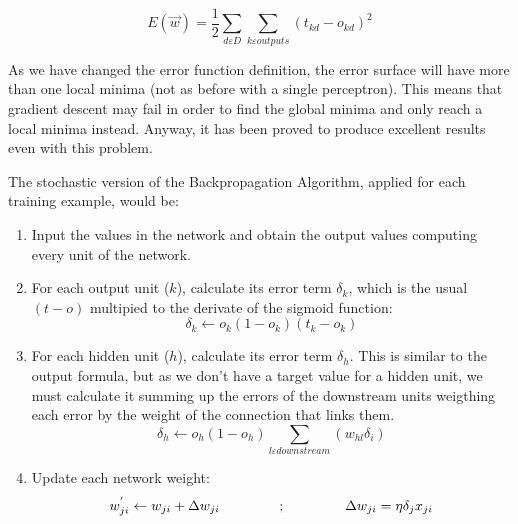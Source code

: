 		\begin{equation}
			\label{squared_error_function_network}
			E(\vec{w}) = \frac{1}{2} \sum_{d \varepsilon D} \sum_{k \varepsilon outputs} (t_{kd}-o_{kd})^2 
		\end{equation}

	As we have changed the error function definition, the error surface will have more than one local minima (not as before with a single perceptron). This means that gradient descent may fail in order to find the global minima and only reach a local minima instead. Anyway, it has been proved to produce excellent results even with this problem.

	The stochastic version of the Backpropagation Algorithm, applied for each training example, would be:

		\begin{enumerate}

			\item Input the values in the network and obtain the output values computing every unit of the network.
			\item For each output unit ($k$), calculate its error term $\delta_k$, which is the usual $(t-o)$ multipied to the derivate of the sigmoid function:
				\begin{equation}
					\label{backpropagation_output_error}
					\delta_k \leftarrow o_k (1 - o_k)(t_k - o_k)
				\end{equation}				

			\item For each hidden unit ($h$), calculate its error term $\delta_h$. This is similar to the output formula, but as we don't have a target value for a hidden unit, we must calculate it summing up the errors of the downstream units weigthing each error by the weight of the connection that links them. 
				\begin{equation}
					\label{backpropagation_hidden_error}
					\delta_h \leftarrow o_h (1 - o_h) \sum_{l \varepsilon downstream} (w_{hl} \delta_i)
				\end{equation}

			\item Update each network weight:
				\begin{equation}
					\label{backpropagation_weight_update}
					w^{'}_{ji} \leftarrow w_{ji} + \Delta w_{ji} \hspace{1.5cm} ; \hspace{1.5cm} \Delta w_{ji} = \eta \delta_j x_{ji}
				\end{equation}

		\end{enumerate} 

